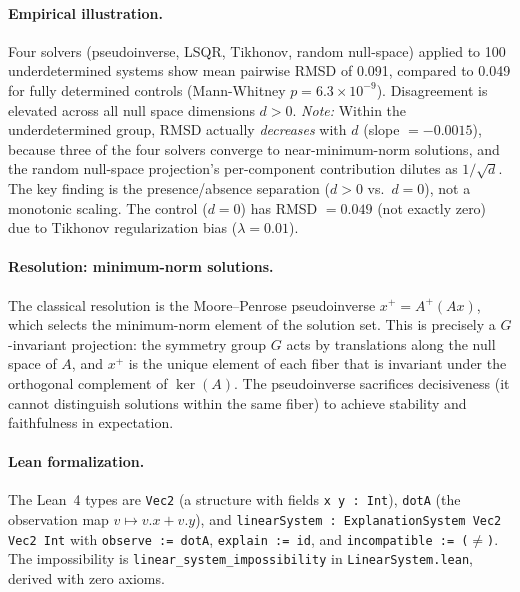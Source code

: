 \paragraph{Empirical illustration.}
Four solvers (pseudoinverse, LSQR, Tikhonov, random null-space) applied to 100
underdetermined systems show mean pairwise RMSD of 0.091, compared to 0.049 for
fully determined controls (Mann-Whitney $p = 6.3 \times 10^{-9}$).
Disagreement is elevated across all null space dimensions $d > 0$.
\emph{Note:} Within the underdetermined group, RMSD actually \emph{decreases}
with $d$ (slope $= -0.0015$), because three of the four solvers converge to
near-minimum-norm solutions, and the random null-space projection's
per-component contribution dilutes as $1/\sqrt{d}$.  The key finding is the
presence/absence separation ($d > 0$ vs.\ $d = 0$), not a monotonic scaling.
The control ($d = 0$) has RMSD $= 0.049$ (not exactly zero) due to
Tikhonov regularization bias ($\lambda = 0.01$).

\paragraph{Resolution: minimum-norm solutions.}
The classical resolution is the Moore--Penrose pseudoinverse
$x^+ = A^+(Ax)$, which selects the minimum-norm element of the solution
set.  This is precisely a $G$-invariant projection: the symmetry group
$G$ acts by translations along the null space of $A$, and $x^+$ is the unique
element of each fiber that is invariant under the orthogonal complement of
$\ker(A)$.  The pseudoinverse sacrifices decisiveness (it cannot distinguish
solutions within the same fiber) to achieve stability and faithfulness
in expectation.

\paragraph{Lean formalization.}
The Lean~4 types are \texttt{Vec2} (a structure with fields \texttt{x y : Int}),
\texttt{dotA} (the observation map $v \mapsto v.x + v.y$), and
\texttt{linearSystem : ExplanationSystem Vec2 Vec2 Int} with
\texttt{observe := dotA}, \texttt{explain := id}, and
\texttt{incompatible := ($\ne$)}.
The impossibility is \texttt{linear\_system\_impossibility} in
\texttt{LinearSystem.lean}, derived with zero axioms.
